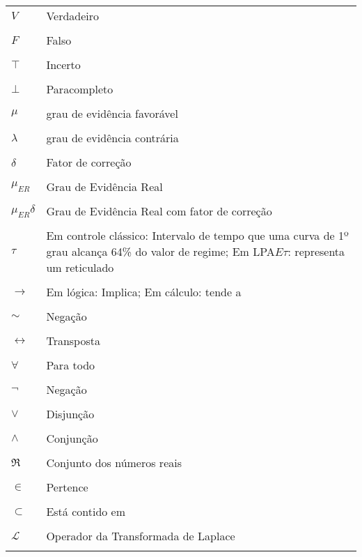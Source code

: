 \thispagestyle{empty}
\begin{longtable}[l]{p{50pt} p{300pt}}
  $V$ & Verdadeiro\\ \\
  $F$ & Falso\\ \\
  $\top$ & Incerto\\ \\
  $\bot$ & Paracompleto\\ \\
  $\mu $ & grau de evidência favorável \\ \\
  $\lambda $ & grau de evidência contrária \\ \\
  $\delta$ & Fator de correção \\ \\
  $\mu_{ER}$ & Grau de Evidência Real \\ \\
  $\mu_{ER}\delta$ & Grau de Evidência Real com fator de correção   \\ \\
  $\tau$ & Em controle clássico: Intervalo de tempo que uma curva de
  1º grau alcança 64\% do valor de regime; Em LPA$E\tau$: representa
  um reticulado\\ \\
  $\rightarrow$ & Em lógica: Implica; Em cálculo: tende a\\ \\
  $\sim$ & Negação\\ \\
  $\leftrightarrow$ & Transposta\\ \\
  $\forall$ & Para todo\\ \\
  $\neg$ & Negação\\ \\
  $\vee$ & Disjunção\\ \\
  $\wedge$ & Conjunção\\ \\
  $\Re$ & Conjunto dos números reais\\ \\
  $\in$ & Pertence\\ \\
  $\subset$ & Está contido em\\ \\
  $\mathscr{L} $ & Operador da Transformada de Laplace \\ \\

\end{longtable}
